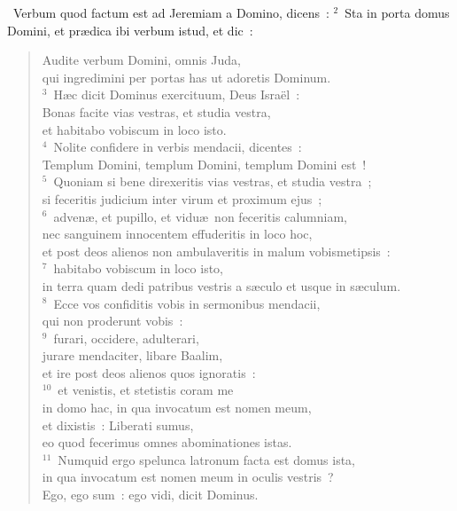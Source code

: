 ~Verbum quod factum est ad Jeremiam a Domino, dicens~:
${}^{2}$~Sta in porta domus Domini, et pr\ae dica ibi verbum istud, et dic~: \begin{flushleft}\begin{verse}Audite verbum Domini, omnis Juda,\\ qui ingredimini per portas has ut adoretis Dominum.\\
${}^{3}$~H\ae c dicit Dominus exercituum, Deus Isra\"el~:\\ Bonas facite vias vestras, et studia vestra,\\ et habitabo vobiscum in loco isto.\\
${}^{4}$~Nolite confidere in verbis mendacii, dicentes~:\\ Templum Domini, templum Domini, templum Domini est~!\\
${}^{5}$~Quoniam si bene direxeritis vias vestras, et studia vestra~;\\ si feceritis judicium inter virum et proximum ejus~;\\
${}^{6}$~adven\ae , et pupillo, et vidu\ae\ non feceritis calumniam,\\ nec sanguinem innocentem effuderitis in loco hoc,\\ et post deos alienos non ambulaveritis in malum vobismetipsis~:\\
${}^{7}$~habitabo vobiscum in loco isto,\\ in terra quam dedi patribus vestris a s\ae culo et usque in s\ae culum.\\
${}^{8}$~Ecce vos confiditis vobis in sermonibus mendacii,\\ qui non proderunt vobis~:\\
${}^{9}$~furari, occidere, adulterari,\\ jurare mendaciter, libare Baalim,\\ et ire post deos alienos quos ignoratis~:\\
${}^{10}$~et venistis, et stetistis coram me\\ in domo hac, in qua invocatum est nomen meum,\\ et dixistis~: Liberati sumus,\\ eo quod fecerimus omnes abominationes istas.\\
${}^{11}$~Numquid ergo spelunca latronum facta est domus ista,\\ in qua invocatum est nomen meum in oculis vestris~?\\ Ego, ego sum~: ego vidi, dicit Dominus.\\

\end{verse}
\end{flushleft}
